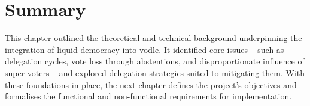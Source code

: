 



\section{Summary}
This chapter outlined the theoretical and technical background underpinning the integration of liquid democracy into vodle. It identified core issues -- such as delegation cycles, vote loss through abstentions, and disproportionate influence of super-voters -- and explored delegation strategies suited to mitigating them. With these foundations in place, the next chapter defines the project's objectives and formalises the functional and non-functional requirements for implementation.